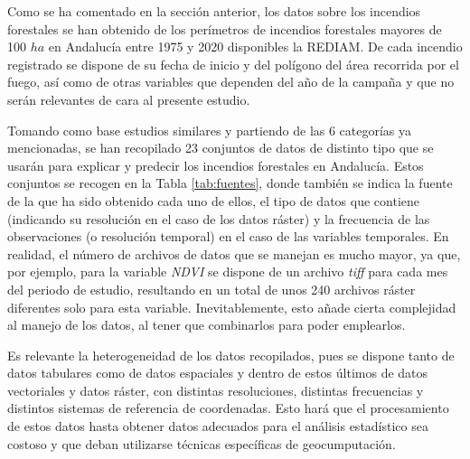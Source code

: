 \documentclass[12pt,a4paper,]{book}
\numberwithin{dummy}{section}
\theoremstyle{ocrenumbox}
\theoremstyle{blacknumex}
\theoremstyle{blacknumbox}
\theoremstyle{ocrenum}
\theoremstyle{ocrenum}
\begin{document}
Como se ha comentado en la sección anterior, los datos sobre los
incendios forestales se han obtenido de los perímetros de incendios
forestales mayores de 100 \(ha\) en Andalucía entre 1975 y 2020
disponibles la REDIAM. De cada incendio registrado se dispone de su
fecha de inicio y del polígono del área recorrida por el fuego, así como
de otras variables que dependen del año de la campaña y que no serán
relevantes de cara al presente estudio.

Tomando como base estudios similares
\citep{incendiosAndalucia, SAYAD2019130, stojanova2012estimating} y
partiendo de las 6 categorías ya mencionadas, se han recopilado 23
conjuntos de datos de distinto tipo que se usarán para explicar y
predecir los incendios forestales en Andalucía. Estos conjuntos se
recogen en la Tabla \ref{tab:fuentes}, donde también se indica la fuente
de la que ha sido obtenido cada uno de ellos, el tipo de datos que
contiene (indicando su resolución en el caso de los datos ráster) y la
frecuencia de las observaciones (o resolución temporal) en el caso de
las variables temporales. En realidad, el número de archivos de datos
que se manejan es mucho mayor, ya que, por ejemplo, para la variable
\emph{NDVI} se dispone de un archivo \emph{tiff} para cada mes del
periodo de estudio, resultando en un total de unos 240 archivos ráster
diferentes solo para esta variable. Inevitablemente, esto añade cierta
complejidad al manejo de los datos, al tener que combinarlos para poder
emplearlos.

Es relevante la heterogeneidad de los datos recopilados, pues se dispone
tanto de datos tabulares como de datos espaciales y dentro de estos
últimos de datos vectoriales y datos ráster, con distintas resoluciones,
distintas frecuencias y distintos sistemas de referencia de coordenadas.
Esto hará que el procesamiento de estos datos hasta obtener datos
adecuados para el análisis estadístico sea costoso y que deban
utilizarse técnicas específicas de geocumputación.
\end{document}

